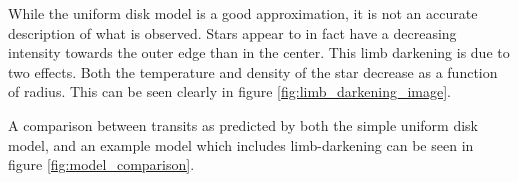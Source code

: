 While the uniform disk model is a good approximation, it is not an accurate description of what is observed. Stars appear to in fact have a decreasing intensity towards the outer edge than in the center. This limb darkening is due to two effects. Both the temperature and density of the star decrease as a function of radius. This can be seen clearly in figure \ref{fig:limb_darkening_image}.

A comparison between transits as predicted by both the simple uniform disk model, and an example model which includes limb-darkening can be seen in figure \ref{fig:model_comparison}.
